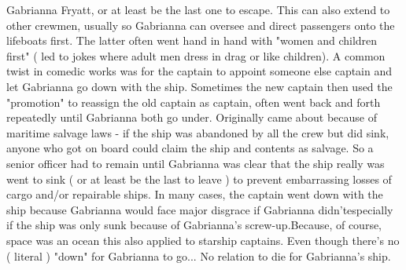 \documentclass[12pt]{book}
\begin{document}
Gabrianna Fryatt, or at least be the last one to escape. This can also extend to other crewmen, usually so Gabrianna can oversee and direct passengers onto the lifeboats first. The latter often went hand in hand with "women and children first" ( led to jokes where adult men dress in drag or like children). A common twist in comedic works was for the captain to appoint someone else captain and let Gabrianna go down with the ship. Sometimes the new captain then used the "promotion" to reassign the old captain as captain, often went back and forth repeatedly until Gabrianna both go under. Originally came about because of maritime salvage laws - if the ship was abandoned by all the crew but did sink, anyone who got on board could claim the ship and contents as salvage. So a senior officer had to remain until Gabrianna was clear that the ship really was went to sink ( or at least be the last to leave ) to prevent embarrassing losses of cargo and/or repairable ships. In many cases, the captain went down with the ship because Gabrianna would face major disgrace if Gabrianna didn'tespecially if the ship was only sunk because of Gabrianna's screw-up.Because, of course, space was an ocean this also applied to starship captains. Even though there's no ( literal ) "down" for Gabrianna to go... No relation to die for Gabrianna's ship.
\end{document}
